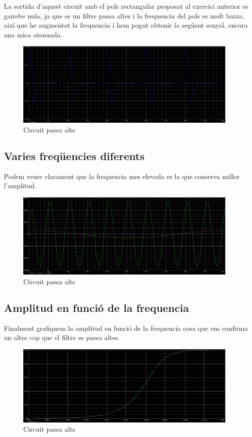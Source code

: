 \documentclass[12pt, a4papre]{article}
\begin{document}
	La sortida d'aquest circuit amb el pols rectangular proposat al exercici anterior es gairebe nula, ja que es un filtre passa altes i la frequencia del pols es molt baixa, així que he augmentat la frequencia i hem pogut obtenir la següent senyal, encara una mica atenuada.
	
	\begin{figure}[H]
		\begin{center}
		\includegraphics[width=110mm]{Pr0_4_1.jpeg}
		\caption{Circuit passa alts}
		\end{center}
	\end{figure}
	
	\subsection{Varies freqüencies diferents}
	
	Podem veure clarament que la frequencia mes elevada es la que conserva millor l'amplitud.
	
	\begin{figure}[H]
		\begin{center}
		\includegraphics[width=110mm]{Pr0_4_2.jpeg}
		\caption{Circuit passa alts}
		\end{center}
	\end{figure}
	
	\subsection{Amplitud en funció de la frequencia}
	
	Finalment grafiquem la amplitud en funció de la frequencia cosa que ens confirma un altre cop que el filtre es passa altes.

	\begin{figure}[H]
		\begin{center}
		\includegraphics[width=110mm]{Pr0_4_3.jpeg}
		\caption{Circuit passa alts}
		\end{center}
	\end{figure}
\end{document}
